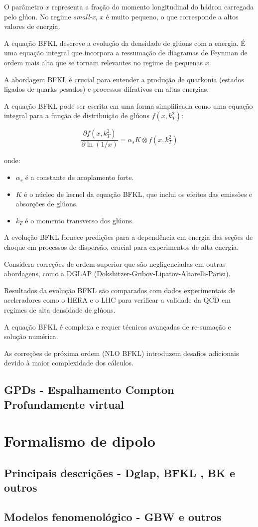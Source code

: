 O parâmetro \(x\) representa a fração do momento longitudinal do hádron carregada pelo glúon. No regime \textit{small-x}, \(x\) é muito pequeno, o que corresponde a altos valores de energia.

A equação BFKL descreve a evolução da densidade de glúons com a energia. É uma equação integral que incorpora a ressumação de diagramas de Feynman de ordem mais alta que se tornam relevantes no regime de pequenas \(x\).

A abordagem BFKL é crucial para entender a produção de quarkonia (estados ligados de quarks pesados) e processos difrativos em altas energias.

A equação BFKL pode ser escrita em uma forma simplificada como uma equação integral para a função de distribuição de glúons \( f(x, k_T^2) \):

\[
    \frac{\partial f(x, k_T^2)}{\partial \ln(1/x)} = \alpha_s K \otimes f(x, k_T^2)
\]

onde:
\begin{itemize}
    \item \(\alpha_s\) é a constante de acoplamento forte.
    \item \(K\) é o núcleo de kernel da equação BFKL, que inclui os efeitos das emissões e absorções de glúons.
    \item \(k_T\) é o momento transverso dos glúons.
\end{itemize}

A evolução BFKL fornece predições para a dependência em energia das seções de choque em processos de dispersão, crucial para experimentos de alta energia.

Considera correções de ordem superior que são negligenciadas em outras abordagens, como a DGLAP (Dokshitzer-Gribov-Lipatov-Altarelli-Parisi).


Resultados da evolução BFKL são comparados com dados experimentais de aceleradores como o HERA e o LHC para verificar a validade da QCD em regimes de alta densidade de glúons.

A equação BFKL é complexa e requer técnicas avançadas de re-sumação e solução numérica.


As correções de próxima ordem (NLO BFKL) introduzem desafios adicionais devido à maior complexidade dos cálculos.



\subsection{GPDs -  Espalhamento Compton Profundamente virtual}
\section{Formalismo de dipolo}
\subsection{Principais descrições - Dglap, BFKL , BK e outros}
\subsection{Modelos fenomenológico - GBW e outros}


